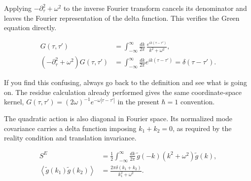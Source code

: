 Applying $-\partial_\tau^2+\omega^2$ to the inverse Fourier transform cancels
its denominator and leaves the Fourier representation of the delta function.
This verifies the Green equation directly.

\begin{align}
  G(\tau,\tau')
  &=\int_{-\infty}^{\infty}\frac{dk}{2\pi}\,
  \frac{e^{ik(\tau-\tau')}}{k^2+\omega^2},
  \label{eq:proposal-fourier-green-function}\\
  (-\partial_\tau^2+\omega^2)G(\tau,\tau')
  &=\int_{-\infty}^{\infty}\frac{dk}{2\pi}
  e^{ik(\tau-\tau')}
  =\delta(\tau-\tau').
  \label{eq:proposal-fourier-green-check}
\end{align}


If you find this confusing, always go back to the definition and see what is
going on.  The residue calculation already performed gives the same
coordinate-space kernel, $G(\tau,\tau')=(2\omega)^{-1}
e^{-\omega|\tau-\tau'|}$ in the present $\hbar=1$ convention.

The quadratic action is also diagonal in Fourier space.  Its normalized mode
covariance carries a delta function imposing $k_1+k_2=0$, as required by the
reality condition and translation invariance.

\begin{align}
  S^E
  &=\frac12\int_{-\infty}^{\infty}\frac{dk}{2\pi}\,
  \widetilde g(-k)(k^2+\omega^2)\widetilde g(k),
  \label{eq:proposal-fourier-action}\\
  \left\langle\widetilde g(k_1)\widetilde g(k_2)\right\rangle
  &=\frac{2\pi\delta(k_1+k_2)}{k_1^2+\omega^2}.
  \label{eq:proposal-fourier-covariance}
\end{align}

